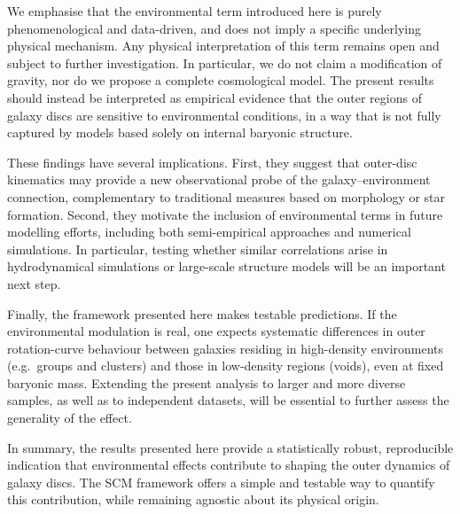 We emphasise that the environmental term introduced here is purely phenomenological and data-driven, and does not imply a specific underlying physical mechanism. Any physical interpretation of this term remains open and subject to further investigation. In particular, we do not claim a modification of gravity, nor do we propose a complete cosmological model. The present results should instead be interpreted as empirical evidence that the outer regions of galaxy discs are sensitive to environmental conditions, in a way that is not fully captured by models based solely on internal baryonic structure.

These findings have several implications. First, they suggest that outer-disc kinematics may provide a new observational probe of the galaxy--environment connection, complementary to traditional measures based on morphology or star formation. Second, they motivate the inclusion of environmental terms in future modelling efforts, including both semi-empirical approaches and numerical simulations. In particular, testing whether similar correlations arise in hydrodynamical simulations or large-scale structure models will be an important next step.

Finally, the framework presented here makes testable predictions. If the environmental modulation is real, one expects systematic differences in outer rotation-curve behaviour between galaxies residing in high-density environments (e.g.\ groups and clusters) and those in low-density regions (voids), even at fixed baryonic mass. Extending the present analysis to larger and more diverse samples, as well as to independent datasets, will be essential to further assess the generality of the effect.

In summary, the results presented here provide a statistically robust, reproducible indication that environmental effects contribute to shaping the outer dynamics of galaxy discs. The SCM framework offers a simple and testable way to quantify this contribution, while remaining agnostic about its physical origin.
